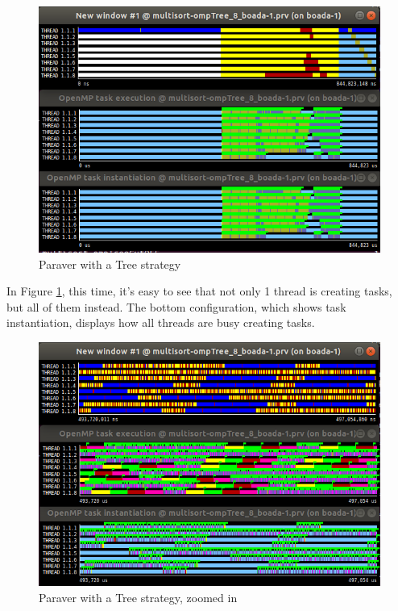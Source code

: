 \documentclass[12]{article}
\begin{document}
\\
\medskip
\begin{figure}[H]
    \centering
    \includegraphics[scale=0.75]{images/paraverTreeNoZoom.PNG}
    \caption{Paraver with a Tree strategy}
    \label{paravertree}
\end{figure}
In Figure \ref{paravertree}, this time, it's easy to see that not only 1 thread is creating tasks, but all of them instead. The bottom configuration, which shows task instantiation, displays how all threads are busy creating tasks.

\medskip
\begin{figure}[H]
    \centering
    \includegraphics[scale=0.75]{images/paraverTreeZoom.PNG}
    \caption{Paraver with a Tree strategy, zoomed in}
    \label{paravertreeZoom}
\end{figure}
\end{document}
